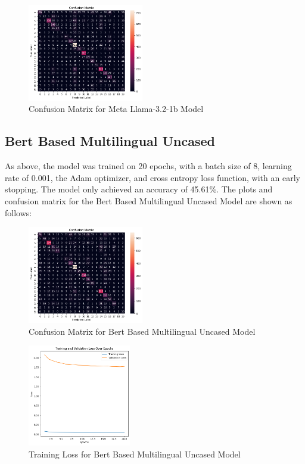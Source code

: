 \begin{figure}[H]
    \centering
    \includegraphics[width=0.45\textwidth]{llama_confmat.png}
    \caption{Confusion Matrix for Meta Llama-3.2-1b Model}
    \label{fig:llama_confmat}
\end{figure}

\subsection{Bert Based Multilingual Uncased}
As above, the model was trained on 20 epochs, with a batch size of 8, learning rate of 0.001, the Adam optimizer, and cross entropy loss function, with an early stopping. The model only achieved an accuracy of 45.61\%. The plots and confusion matrix for the Bert Based Multilingual Uncased Model are shown as follows:

\begin{figure}[H]
    \centering
    \includegraphics[width=0.45\textwidth]{bbmu_confmat.png}
    \caption{Confusion Matrix for Bert Based Multilingual Uncased Model}
    \label{fig:bbmu_confmat}
\end{figure}

\begin{figure}[H]
    \centering
    \includegraphics[width=0.4\textwidth]{bbmu_trainloss.png}
    \caption{Training Loss for Bert Based Multilingual Uncased Model}
    \label{fig:bbmu_trainloss}
\end{figure}

